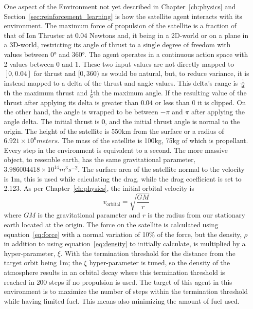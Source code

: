 One aspect of the Environment not yet described in Chapter~\ref{ch:physics} and Section~\ref{sec:reinforcement_learning} is how the satellite agent interacts with its environment. The maximum force of propulsion of the satellite is a fraction of that of Ion Thruster at $0.04$ Newtons and, it being in a 2D-world or on a plane in a 3D-world, restricting its angle of thrust to a single degree of freedom with values between 0\si{\degree} and 360\si{\degree}. The agent operates in a continuous action space with 2 values between 0 and 1. These two input values are not directly mapped to $[0, 0.04]$ for thrust and $[0, 360)$ as would be natural, but, to reduce variance, it is instead mapped to a delta of the thrust and angle values. This delta's range is $\frac{1}{50}$th the maximum thrust and $\frac{1}{6}$th the maximum angle. If the resulting value of the thrust after applying its delta is greater than $0.04$ or less than $0$ it is clipped. On the other hand, the angle is wrapped to be between $-\pi$ and $\pi$ after applying the angle delta. The initial thrust is 0, and the initial thrust angle is normal to the origin. The height of the satellite is 550\si{km} from the surface or a radius of $6.921\times 10^6\si{meters}$. The mass of the satellite is 100\si{kg}, 75\si{kg} of which is propellant. Every step in the environment is equivalent to a second. The more massive object, to resemble earth, has the same gravitational parameter, $3.986004418\times 10^{14}\si{m^3s^{-2}}$. The surface area of the satellite normal to the velocity is 1\si{m}, this is used while calculating the drag, while the drag coefficient is set to 2.123. As per Chapter~\ref{ch:physics}, the initial orbital velocity is $$v_{\text{orbital}}=\sqrt{\frac{GM}{r}}$$ where $GM$ is the gravitational parameter and $r$ is the radius from our stationary earth located at the origin. The force on the satellite is calculated using equation~\ref{eq:force} with a normal variation of 10\% of the force, but the density, $\rho$ in addition to using equation~\ref{eq:density} to initially calculate, is multiplied by a hyper-parameter, $\xi$. With the termination threshold for the distance from the target orbit being 1\si{m}; the $\xi$ hyper-parameter is tuned, so the density of the atmosphere results in an orbital decay where this termination threshold is reached in 200 steps if no propulsion is used. The target of this agent in this environment is to maximize the number of steps within the termination threshold while having limited fuel. This means also minimizing the amount of fuel used.

